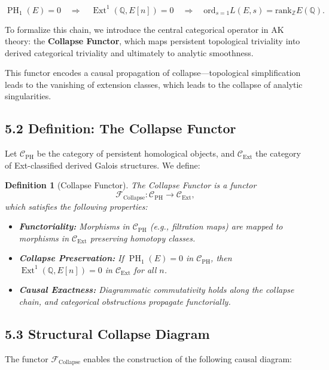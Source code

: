 \documentclass[11pt]{article}
\newtheorem{definition}[theorem]{Definition}
\DeclareMathOperator{\Ext}{Ext}
\DeclareMathOperator{\PH}{PH}
\newcommand{\QQ}{\mathbb{Q}}
\newcommand{\ZZ}{\mathbb{Z}}
\begin{document}
\[
\PH_1(E) = 0 \quad \Longrightarrow \quad \Ext^1(\QQ,E[n]) = 0 \quad \Longrightarrow \quad \mathrm{ord}_{s=1} L(E,s) = \mathrm{rank}_{\ZZ} E(\QQ).
\]

To formalize this chain, we introduce the central categorical operator in AK theory:  
the \textbf{Collapse Functor}, which maps persistent topological triviality into derived categorical triviality and ultimately to analytic smoothness.

This functor encodes a causal propagation of collapse—topological simplification leads to the vanishing of extension classes, which leads to the collapse of analytic singularities.

\subsection{5.2 Definition: The Collapse Functor}

Let $\mathcal{C}_{\mathrm{PH}}$ be the category of persistent homological objects, and $\mathcal{C}_{\mathrm{Ext}}$ the category of Ext-classified derived Galois structures.  
We define:

\begin{definition}[Collapse Functor]
The \emph{Collapse Functor} is a functor
\[
\mathcal{F}_{\mathrm{Collapse}} : \mathcal{C}_{\mathrm{PH}} \longrightarrow \mathcal{C}_{\mathrm{Ext}},
\]
which satisfies the following properties:
\begin{itemize}
  \item \textbf{Functoriality:} Morphisms in $\mathcal{C}_{\mathrm{PH}}$ (e.g., filtration maps) are mapped to morphisms in $\mathcal{C}_{\mathrm{Ext}}$ preserving homotopy classes.
  \item \textbf{Collapse Preservation:} If $\PH_1(E) = 0$ in $\mathcal{C}_{\mathrm{PH}}$, then $\Ext^1(\QQ,E[n]) = 0$ in $\mathcal{C}_{\mathrm{Ext}}$ for all $n$.
  \item \textbf{Causal Exactness:} Diagrammatic commutativity holds along the collapse chain, and categorical obstructions propagate functorially.
\end{itemize}
\end{definition}

\subsection{5.3 Structural Collapse Diagram}

The functor $\mathcal{F}_{\mathrm{Collapse}}$ enables the construction of the following causal diagram:
\end{document}
